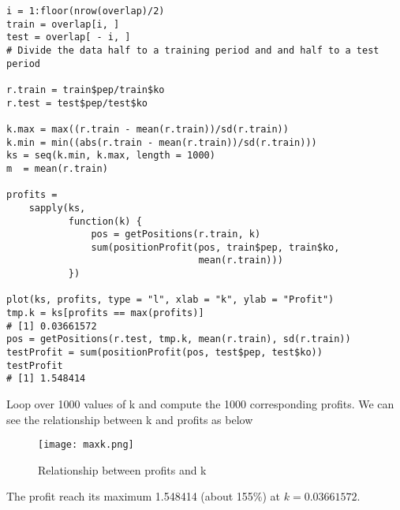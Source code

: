 \documentclass{article}
\begin{document}
\begin{verbatim}
i = 1:floor(nrow(overlap)/2)
train = overlap[i, ]
test = overlap[ - i, ]
# Divide the data half to a training period and and half to a test period

r.train = train$pep/train$ko
r.test = test$pep/test$ko

k.max = max((r.train - mean(r.train))/sd(r.train))
k.min = min((abs(r.train - mean(r.train))/sd(r.train)))
ks = seq(k.min, k.max, length = 1000)
m  = mean(r.train)

profits =
    sapply(ks,
           function(k) {
               pos = getPositions(r.train, k)
               sum(positionProfit(pos, train$pep, train$ko, 
                                  mean(r.train)))
           })

plot(ks, profits, type = "l", xlab = "k", ylab = "Profit")
tmp.k = ks[profits == max(profits)]  
# [1] 0.03661572
pos = getPositions(r.test, tmp.k, mean(r.train), sd(r.train))
testProfit = sum(positionProfit(pos, test$pep, test$ko)) 
testProfit
# [1] 1.548414
\end{verbatim}
Loop over 1000 values of k and compute the 1000 corresponding profits. We can see the relationship between k and profits as below

\begin{figure}[H] 
\begin{center} 
\texttt{[image: maxk.png]}  
\caption{Relationship between profits and k} 
\end{center} 
\end{figure}
The profit reach its maximum 1.548414 (about 155\%) at $k=0.03661572$.
\end{document}
